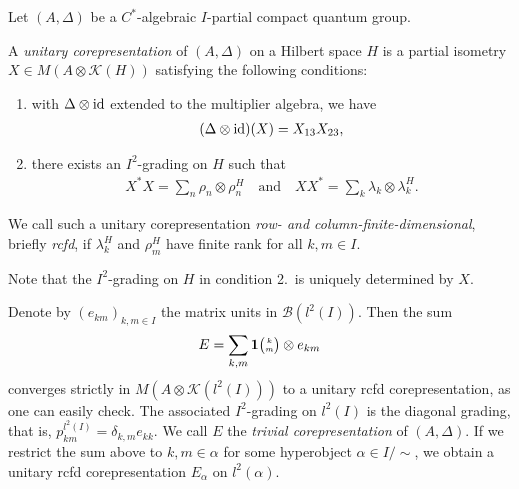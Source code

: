  \begin{Def} \label{def:corepresentation} Let $(A,\Delta)$ be a
   $C^{*}$-algebraic $I$-partial compact quantum group. 

   A \emph{unitary corepresentation} of $(A,\Delta)$ on a Hilbert
   space $H$ is a partial isometry $X \in M(A \otimes \mathcal{K}(H))$
   satisfying the following conditions:
   \begin{enumerate}
   \item with $\Delta \otimes \operatorname{id}$ extended to the multiplier algebra, we have
     \begin{align} \label{eq:corep}
     (\Delta \otimes \operatorname{id})(X) = X_{13}X_{23},  
   \end{align}
 \item there exists an $I^{2}$-grading on $H$ such that
     \begin{align} \label{eq:corep-pi}
       X^{*}X= \sum_{n}\rho_{n} \otimes \rho^{H}_{n} \quad \text{and}
       \quad XX^{*} = \sum_{k} \lambda_{k} \otimes \lambda^{H}_{k}.
     \end{align}
   \end{enumerate}
   We call such a unitary corepresentation \emph{row- and column-finite-dimensional}, briefly
   \emph{rcfd}, if $\lambda^{H}_{k}$ and $\rho^{H}_{m}$ have finite rank for all $k,m\in I$.
\end{Def}
Note that the $I^{2}$-grading on $H$ in  condition 2.\ is uniquely
determined by $X$.

\begin{Exa} \label{exa:corep-trivial}
  Denote by $(e_{km})_{k,m\in I}$ the matrix units in $\mathcal{B}(l^{2}(I))$. Then the sum
  \begin{align*}
    E = \sum_{k,m} \mathbf{1}{\tiny {\begin{pmatrix} k\\m\end{pmatrix}}} \otimes e_{km} 
  \end{align*}
  converges strictly in $M(A\otimes \mathcal{K}(l^{2}(I)))$ to a unitary rcfd corepresentation, as
  one can easily check. The associated $I^{2}$-grading on $l^{2}(I)$ is the diagonal grading, that
  is, $p^{l^{2}(I)}_{km} =\delta_{k,m} e_{kk}$. We call $E$ the \emph{trivial corepresentation} of
  $(A,\Delta)$. 
If we restrict the sum above to $k,m \in \alpha$ for some hyperobject $\alpha \in I/\sim$, we obtain a unitary rcfd corepresentation $E_{\alpha}$ on $l^{2}(\alpha)$.
\end{Exa}

